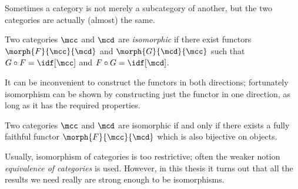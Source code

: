 Sometimes a category is not merely a subcategory of another, but the two
categories are actually (almost) the same.

\begin{definition}
    Two categories \(\mcc\) and \(\mcd\) are \emph{isomorphic} if there exist
    functors \(\morph{F}{\mcc}{\mcd}\) and \(\morph{G}{\mcd}{\mcc}\) such that
    \(G \circ F = \idf[\mcc]\) and \(F \circ G = \idf[\mcd]\).
\end{definition}

It can be inconvenient to construct the functors in both directions; fortunately
isomorphism can be shown by constructing just the functor in one direction, as
long as it has the required properties.

\begin{lemma}
    Two categories \(\mcc\) and \(\mcd\) are isomorphic if and only if there
    exists a fully faithful functor \(\morph{F}{\mcc}{\mcd}\) which is also
    bijective on objects.
\end{lemma}

\begin{remark}
    Usually, isomorphism of categories is too restrictive; often the weaker
    notion \emph{equivalence of categories} is used.
    However, in this thesis it turns out that all the results we need really are
    strong enough to be isomorphisms.
\end{remark}